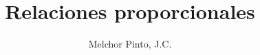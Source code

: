 \documentclass[12pt,addpoints,answers]{guia}
\title{Relaciones proporcionales}
\author{Melchor Pinto, J.C.}
\begin{document}
\INFO%
\begin{questions}
    \questionboxed[50] 
    \questionboxed[50] 
\end{questions}
\end{document}
